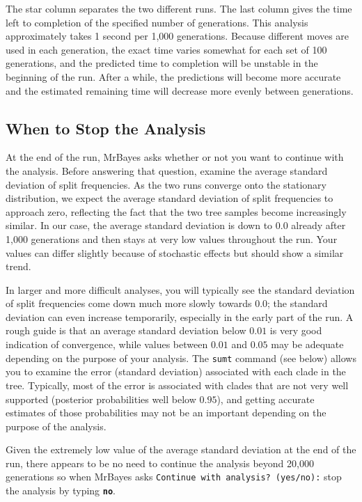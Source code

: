 \documentclass[12pt]{book}
\newcommand{\ttt}[1]{\texttt{#1}}
\newcommand{\tb}[1]{\ttt{\textbf{#1}}}
\begin{document}
The star column separates the two different runs. The last column gives the time left to completion
of the specified number of generations. This analysis approximately takes 1 second per 1,000
generations. Because different moves are used in each generation, the exact time varies somewhat
for each set of 100 generations, and the predicted time to completion will be unstable in the
beginning of the run. After a while, the predictions will become more accurate and the estimated
remaining time will decrease more evenly between generations.

\subsection{When to Stop the Analysis}

At the end of the run, MrBayes asks whether or not you want to continue with the analysis. Before
answering that question, examine the average standard deviation of split frequencies. As the two
runs converge onto the stationary distribution, we expect the average standard deviation of split
frequencies to approach zero, reflecting the fact that the two tree samples become increasingly
similar. In our case, the average standard deviation is down to 0.0 already after 1,000 generations
and then stays at very low values throughout the run. Your values can differ slightly because of
stochastic effects but should show a similar trend.

In larger and more difficult analyses, you will typically see the standard deviation of split
frequencies come down much more slowly towards 0.0; the standard deviation can even increase
temporarily, especially in the early part of the run. A rough guide is that an average standard
deviation below $0.01$ is very good indication of convergence, while values between $0.01$ and
$0.05$ may be adequate depending on the purpose of your analysis. The \ttt{sumt} command (see
below) allows you to examine the error (standard deviation) associated with each clade in the tree.
Typically, most of the error is associated with clades that are not very well supported (posterior
probabilities well below $0.95$), and getting accurate estimates of those probabilities may not be
an important depending on the purpose of the analysis.

Given the extremely low value of the average standard deviation at the end of the run, there
appears to be no need to continue the analysis beyond 20,000 generations so when MrBayes asks
\ttt{Continue with analysis? (yes/no):} stop the analysis by typing \tb{no}.
\end{document}
